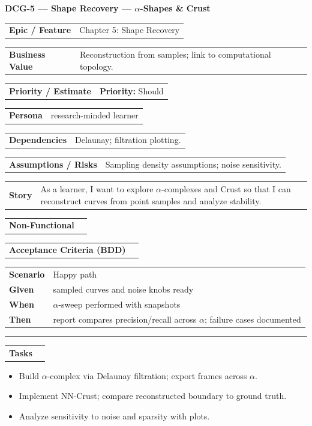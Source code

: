 \documentclass[11pt,a4paper]{article}
\makeatletter
\newcommand{\FieldRow}[2]{%
  \noindent\begin{tabularx}{\linewidth}{@{}>{\bfseries}l X@{}}#1 & #2\\\end{tabularx}%
}
\newcommand{\CardDivider}{\par\noindent\color{CardBorder}\rule{\linewidth}{0.4pt}\par\noindent\color{black}}
\newcommand{\StoryHeader}[2]{%
  {\large\bfseries \textcolor{CardTitle}{#1} --- #2}
}
\newcommand{\BDD}[4]{%
  \FieldRow{Acceptance Criteria (BDD)}{}
  \vspace{-0.75\baselineskip}
  \begin{tabularx}{\linewidth}{@{}>{\bfseries}l X@{}}
  Scenario & #1\\
  Given & #2\\
  When & #3\\
  Then & #4\\
  \end{tabularx}
}
\newenvironment{TaskList}{%
  \begin{itemize}[leftmargin=1.25em,label=\(\square\)]
}{\end{itemize}}
\makeatother
\begin{document}
\begin{StoryCardBox}
\StoryHeader{DCG-5}{Shape Recovery — $\alpha$-Shapes \& Crust}\\[0.4em]
\FieldRow{Epic / Feature}{Chapter 5: Shape Recovery}
\FieldRow{Business Value}{Reconstruction from samples; link to computational topology.}
\FieldRow{Priority / Estimate}{\textbf{Priority:} Should \quad \nfchip{SP: 5}}
\FieldRow{Persona}{research-minded learner}
\FieldRow{Dependencies}{Delaunay; filtration plotting.}
\FieldRow{Assumptions / Risks}{Sampling density assumptions; noise sensitivity.}
\FieldRow{Story}{As a learner, I want to explore $\alpha$-complexes and Crust so that I can reconstruct curves from point samples and analyze stability.}

\FieldRow{Non-Functional}{\nfchip{Rigor} \nfchip{Reproducibility} \nfchip{Clarity}}

\BDD{Happy path}{sampled curves and noise knobs ready}{$\alpha$-sweep performed with snapshots}{report compares precision/recall across $\alpha$; failure cases documented}

\CardDivider
\FieldRow{\large Tasks}{}
\begin{TaskList}
  \item Build $\alpha$-complex via Delaunay filtration; export frames across $\alpha$.
  \item Implement NN-Crust; compare reconstructed boundary to ground truth.
  \item Analyze sensitivity to noise and sparsity with plots.
\end{TaskList}
\end{StoryCardBox}
\end{document}
